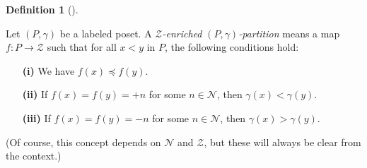 \documentclass[numbers=enddot,12pt,final,onecolumn,notitlepage]{scrartcl}%
\theoremstyle{definition}
\newtheorem{defi}[theo]{Definition}
\newenvironment{definition}[1][]
{\begin{defi}[#1]\begin{leftbar}}
{\end{leftbar}\end{defi}}
\begin{document}
\begin{definition}
\label{def.ambivPp}Let $\left(  P,\gamma\right)  $ be a labeled poset. A
\textit{$\mathcal{Z}$-enriched }$\left(  P,\gamma\right)  $\textit{-partition}
means a map $f:P\rightarrow\mathcal{Z}$ such that for all $x<y$ in $P$, the
following conditions hold:

\begin{enumerate}
\item[\textbf{(i)}] We have $f\left(  x\right)  \preccurlyeq f\left(
y\right)  $.

\item[\textbf{(ii)}] If $f\left(  x\right)  =f\left(  y\right)  =+n$ for some
$n\in\mathcal{N}$, then $\gamma\left(  x\right)  <\gamma\left(  y\right)  $.

\item[\textbf{(iii)}] If $f\left(  x\right)  =f\left(  y\right)  =-n$ for some
$n\in\mathcal{N}$, then $\gamma\left(  x\right)  >\gamma\left(  y\right)  $.
\end{enumerate}

(Of course, this concept depends on $\mathcal{N}$ and $\mathcal{Z}$, but these
will always be clear from the context.)
\end{definition}
\end{document}
